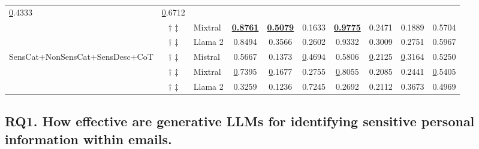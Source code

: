 \begin{table*}[!h]
\begin{tabular}{@{}lclccccccc@{}}
  {\ul 0.4333} &
  {\ul 0.6712} \\
 &
  $\dagger$ $\ddagger$ &
  Mixtral &
  {\ul \textbf{0.8761}} &
  {\ul \textbf{0.5079}} &
  0.1633 &
  {\ul \textbf{0.9775}} &
  0.2471 &
  0.1889 &
  0.5704 \\
 &
  $\dagger$ $\ddagger$ &
  Llama 2 &
  0.8494 &
  0.3566 &
  0.2602 &
  0.9332 &
  0.3009 &
  0.2751 &
  0.5967 \\ \cmidrule(l){3-10}
\multirow{3}{*}{SensCat+NonSensCat+SensDesc+CoT} &
  $\dagger$ $\ddagger$ &
  Mistral &
  0.5667 &
  0.1373 &
  {\ul 0.4694} &
  0.5806 &
  {\ul 0.2125} &
  {\ul 0.3164} &
  0.5250 \\
 &
  $\dagger$ $\ddagger$ &
  Mixtral &
  {\ul 0.7395} &
  {\ul 0.1677} &
  0.2755 &
  {\ul 0.8055} &
  0.2085 &
  0.2441 &
  {\ul 0.5405} \\
 &
  $\dagger$ $\ddagger$ &
  Llama 2 &
  0.3259 &
  0.1236 &
  0.7245 &
  0.2692 &
  0.2112 &
  0.3673 &
  0.4969 \\ \cmidrule(l){1-10} 
\end{tabular}
\end{table*}

\subsection{RQ1. How effective are generative LLMs for identifying sensitive personal information within emails.}

